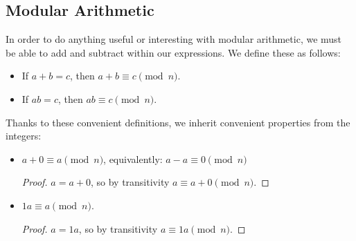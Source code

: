 \documentclass{article}
\begin{document}
\subsection{Modular Arithmetic}

In order to do anything useful or interesting with modular arithmetic, we must be able to add and subtract within our expressions. We define these as follows:

\begin{itemize}
    \item If $a+b=c$, then $a+b\equiv c\pmod{n}$.
    \item If $ab=c$, then $ab\equiv c\pmod{n}$.
\end{itemize}
Thanks to these convenient definitions, we inherit convenient properties from the integers:
\begin{itemize}
    \item $a+0\equiv a\pmod{n}$, equivalently: $a-a\equiv 0\pmod{n}$
        \begin{proof} 
            $a=a+0$, so by transitivity $a\equiv a+0\pmod{n} $.
        \end{proof}
    \item $1a\equiv a\pmod{n}$.
        \begin{proof} 
            $a=1a$, so by transitivity $a\equiv 1a\pmod{n} $.
        \end{proof}
\end{itemize}
\end{document}
